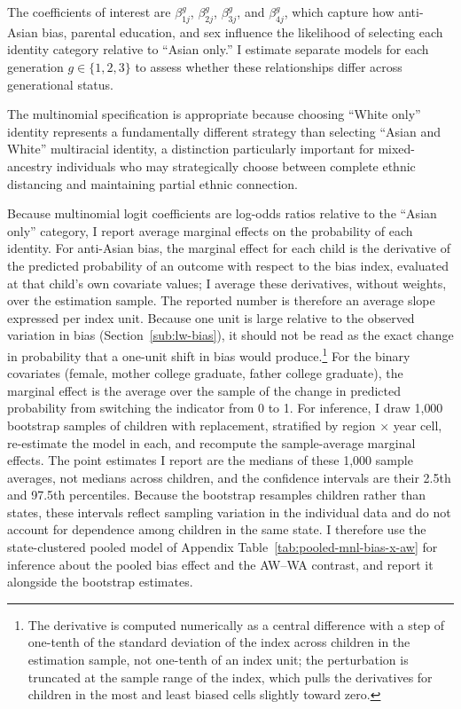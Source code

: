 The coefficients of interest are $\beta_{1j}^g$, $\beta_{2j}^g$, $\beta_{3j}^g$, and $\beta_{4j}^g$, which capture how anti-Asian bias, parental education, and sex influence the likelihood of selecting each identity category relative to ``Asian only.'' I estimate separate models for each generation $g \in \{1,2,3\}$ to assess whether these relationships differ across generational status.

The multinomial specification is appropriate because choosing ``White only'' identity represents a fundamentally different strategy than selecting ``Asian and White'' multiracial identity, a distinction particularly important for mixed-ancestry individuals who may strategically choose between complete ethnic distancing and maintaining partial ethnic connection.

Because multinomial logit coefficients are log-odds ratios relative to the ``Asian only'' category, I report average marginal effects on the probability of each identity. For anti-Asian bias, the marginal effect for each child is the derivative of the predicted probability of an outcome with respect to the bias index, evaluated at that child's own covariate values; I average these derivatives, without weights, over the estimation sample. The reported number is therefore an average slope expressed per index unit. Because one unit is large relative to the observed variation in bias (Section~\ref{sub:lw-bias}), it should not be read as the exact change in probability that a one-unit shift in bias would produce.\footnote{The derivative is computed numerically as a central difference with a step of one-tenth of the standard deviation of the index across children in the estimation sample, not one-tenth of an index unit; the perturbation is truncated at the sample range of the index, which pulls the derivatives for children in the most and least biased cells slightly toward zero.} For the binary covariates (female, mother college graduate, father college graduate), the marginal effect is the average over the sample of the change in predicted probability from switching the indicator from 0 to 1. For inference, I draw 1{,}000 bootstrap samples of children with replacement, stratified by region $\times$ year cell, re-estimate the model in each, and recompute the sample-average marginal effects. The point estimates I report are the medians of these 1{,}000 sample averages, not medians across children, and the confidence intervals are their 2.5th and 97.5th percentiles. Because the bootstrap resamples children rather than states, these intervals reflect sampling variation in the individual data and do not account for dependence among children in the same state. I therefore use the state-clustered pooled model of Appendix Table~\ref{tab:pooled-mnl-bias-x-aw} for inference about the pooled bias effect and the AW--WA contrast, and report it alongside the bootstrap estimates.

